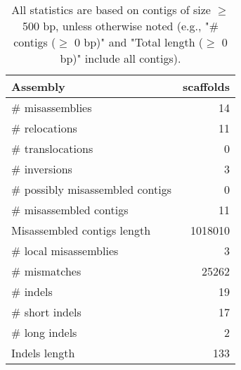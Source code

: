 \documentclass[12pt,a4paper]{article}
\begin{document}
\begin{table}[ht]
\begin{center}
\caption{All statistics are based on contigs of size $\geq$ 500 bp, unless otherwise noted (e.g., "\# contigs ($\geq$ 0 bp)" and "Total length ($\geq$ 0 bp)" include all contigs).}
\begin{tabular}{|l*{1}{|r}|}
\hline
Assembly & scaffolds \\ \hline
\# misassemblies & 14 \\ \hline
\hspace{5mm}\# relocations & 11 \\ \hline
\hspace{5mm}\# translocations & 0 \\ \hline
\hspace{5mm}\# inversions & 3 \\ \hline
\# possibly misassembled contigs & 0 \\ \hline
\# misassembled contigs & 11 \\ \hline
Misassembled contigs length & 1018010 \\ \hline
\# local misassemblies & 3 \\ \hline
\# mismatches & 25262 \\ \hline
\# indels & 19 \\ \hline
\hspace{5mm}\# short indels & 17 \\ \hline
\hspace{5mm}\# long indels & 2 \\ \hline
Indels length & 133 \\ \hline
\end{tabular}
\end{center}
\end{table}
\end{document}
